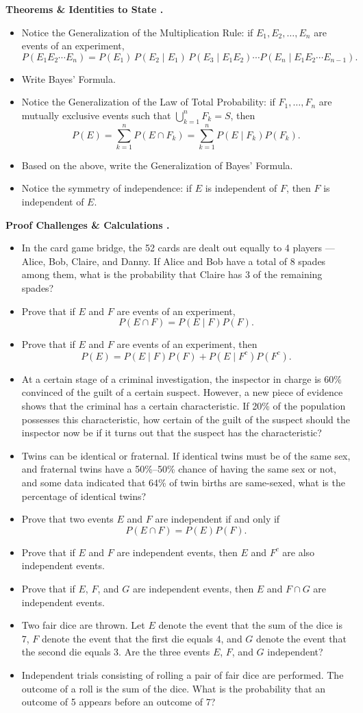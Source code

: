 \documentclass{../../../templates/natsirt}
\newcounter{topic}[section]
\newenvironment{theoremsbox}{%
    \begin{greenbox}\refstepcounter{topic}\textbf{Theorems \& Identities to State \thesection.\thetopic}%
}{\end{greenbox}}
\newenvironment{challengebox}{%
    \begin{redbox}\refstepcounter{topic}\textbf{Proof Challenges \& Calculations \thesection.\thetopic}%
}{\end{redbox}}
\newcommand{\citem}{\item[$\square$]}
\begin{document}
\begin{theoremsbox}
\begin{itemize}
    \citem Notice the Generalization of the Multiplication Rule: if $E_1, E_2, \dots, E_n$ are events of an experiment,
    \[
        P(E_1 E_2 \cdots E_n) = P(E_1)\, P(E_2 \mid E_1)\, P(E_3 \mid E_1 E_2) \cdots P(E_n \mid E_1 E_2 \cdots E_{n-1}).
    \]
    \citem Write Bayes' Formula.
    \citem Notice the Generalization of the Law of Total Probability: if $F_1, \dots, F_n$ are mutually exclusive events such that $\bigcup_{k=1}^n F_k = S$, then
    \[
        P(E) = \sum_{k=1}^n P(E \cap F_k) = \sum_{k=1}^n P(E \mid F_k) P(F_k).
    \]
    \citem Based on the above, write the Generalization of Bayes' Formula.
    \citem Notice the symmetry of independence: if $E$ is independent of $F$, then $F$ is independent of $E$.
\end{itemize}
\end{theoremsbox}

\begin{challengebox}
\begin{itemize}
    \citem In the card game bridge, the 52 cards are dealt out equally to 4 players --- Alice, Bob, Claire, and Danny. If Alice and Bob have a total of 8 spades among them, what is the probability that Claire has 3 of the remaining spades?
    \citem Prove that if $E$ and $F$ are events of an experiment,
    \[
        P(E \cap F) = P(E \mid F) P(F).
    \]
    \citem Prove that if $E$ and $F$ are events of an experiment, then
    \[
        P(E) = P(E \mid F) P(F) + P(E \mid F^c) P(F^c).
    \]
    \citem At a certain stage of a criminal investigation, the inspector in charge is 60\% convinced of the guilt of a certain suspect. However, a new piece of evidence shows that the criminal has a certain characteristic. If 20\% of the population possesses this characteristic, how certain of the guilt of the suspect should the inspector now be if it turns out that the suspect has the characteristic?
    \citem Twins can be identical or fraternal. If identical twins must be of the same sex, and fraternal twins have a 50\%--50\% chance of having the same sex or not, and some data indicated that 64\% of twin births are same-sexed, what is the percentage of identical twins?
    \citem Prove that two events $E$ and $F$ are independent if and only if
    \[
        P(E \cap F) = P(E) P(F).
    \]
    \citem Prove that if $E$ and $F$ are independent events, then $E$ and $F^c$ are also independent events.
    \citem Prove that if $E$, $F$, and $G$ are independent events, then $E$ and $F \cap G$ are independent events.
    \citem Two fair dice are thrown. Let $E$ denote the event that the sum of the dice is 7, $F$ denote the event that the first die equals 4, and $G$ denote the event that the second die equals 3. Are the three events $E$, $F$, and $G$ independent?
    \citem Independent trials consisting of rolling a pair of fair dice are performed. The outcome of a roll is the sum of the dice. What is the probability that an outcome of 5 appears before an outcome of 7?
\end{itemize}
\end{challengebox}
\end{document}
